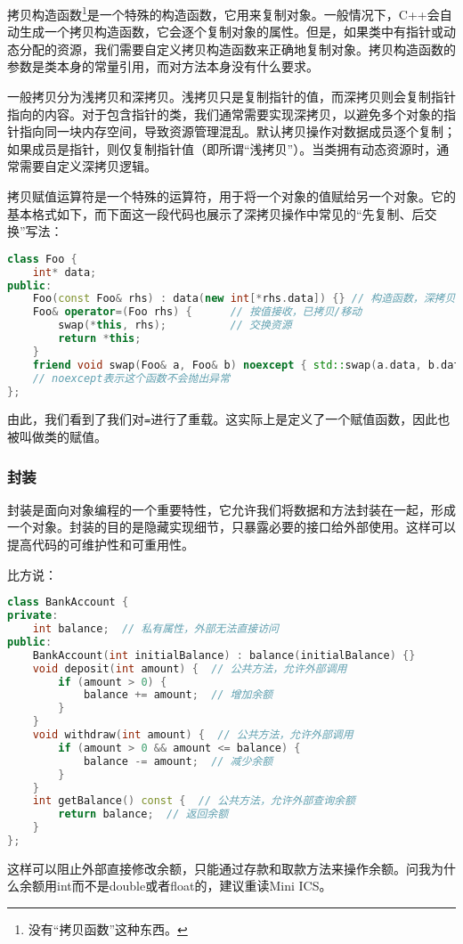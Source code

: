 \documentclass[../main.tex]{subfiles}
\begin{document}
拷贝构造函数\footnote{没有“拷贝函数”这种东西。}是一个特殊的构造函数，它用来复制对象。一般情况下，C++会自动生成一个拷贝构造函数，它会逐个复制对象的属性。但是，如果类中有指针或动态分配的资源，我们需要自定义拷贝构造函数来正确地复制对象。拷贝构造函数的参数是类本身的常量引用，而对方法本身没有什么要求。

一般拷贝分为浅拷贝和深拷贝。浅拷贝只是复制指针的值，而深拷贝则会复制指针指向的内容。对于包含指针的类，我们通常需要实现深拷贝，以避免多个对象的指针指向同一块内存空间，导致资源管理混乱。默认拷贝操作对数据成员逐个复制；如果成员是指针，则仅复制指针值（即所谓“浅拷贝”）。当类拥有动态资源时，通常需要自定义深拷贝逻辑。

拷贝赋值运算符是一个特殊的运算符，用于将一个对象的值赋给另一个对象。它的基本格式如下，而下面这一段代码也展示了深拷贝操作中常见的“先复制、后交换”写法：
\begin{lstlisting}[language=C++]
class Foo {
    int* data;
public:
    Foo(const Foo& rhs) : data(new int[*rhs.data]) {} // 构造函数，深拷贝
    Foo& operator=(Foo rhs) {      // 按值接收，已拷贝/移动
        swap(*this, rhs);          // 交换资源
        return *this;
    }
    friend void swap(Foo& a, Foo& b) noexcept { std::swap(a.data, b.data); }
    // noexcept表示这个函数不会抛出异常
};
\end{lstlisting}
由此，我们看到了我们对\texttt{=}进行了重载。这实际上是定义了一个赋值函数，因此也被叫做类的赋值。

\subsubsection{封装}

封装是面向对象编程的一个重要特性，它允许我们将数据和方法封装在一起，形成一个对象。封装的目的是隐藏实现细节，只暴露必要的接口给外部使用。这样可以提高代码的可维护性和可重用性。

比方说：
\begin{lstlisting}[language=C++]
class BankAccount {
private:
    int balance;  // 私有属性，外部无法直接访问
public:
    BankAccount(int initialBalance) : balance(initialBalance) {}
    void deposit(int amount) {  // 公共方法，允许外部调用
        if (amount > 0) {
            balance += amount;  // 增加余额
        }
    }
    void withdraw(int amount) {  // 公共方法，允许外部调用
        if (amount > 0 && amount <= balance) {
            balance -= amount;  // 减少余额
        }
    }
    int getBalance() const {  // 公共方法，允许外部查询余额
        return balance;  // 返回余额
    }
};
\end{lstlisting}
这样可以阻止外部直接修改余额，只能通过存款和取款方法来操作余额。问我为什么余额用int而不是double或者float的，建议重读Mini ICS。
\end{document}
